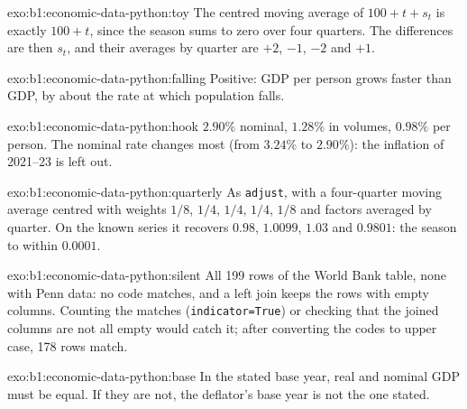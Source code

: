 \begin{solution}{exo:b1:economic-data-python:toy}
The centred moving average of $100 + t + s_t$ is exactly $100 + t$, since the
season sums to zero over four quarters. The differences are then $s_t$, and
their averages by quarter are $+2$, $-1$, $-2$ and $+1$.
\end{solution}

\begin{solution}{exo:b1:economic-data-python:falling}
Positive: GDP per person grows faster than GDP, by about the rate at which
population falls.
\end{solution}

\begin{solution}{exo:b1:economic-data-python:hook}
$2.90\%$ nominal, $1.28\%$ in volumes, $0.98\%$ per person. The nominal rate changes
most (from $3.24\%$ to $2.90\%$): the inflation of 2021--23 is left out.
\end{solution}

\begin{solution}{exo:b1:economic-data-python:quarterly}
As \texttt{adjust}, with a four-quarter moving average centred with weights $1/8$,
$1/4$, $1/4$, $1/4$, $1/8$ and factors averaged by quarter. On the known series it
recovers $0.98$, $1.0099$, $1.03$ and $0.9801$: the season to within $0.0001$.
\end{solution}

\begin{solution}{exo:b1:economic-data-python:silent}
All 199 rows of the World Bank table, none with Penn data: no code matches,
and a left join keeps the rows with empty columns. Counting the matches
(\texttt{indicator=True}) or checking that the joined columns are not all empty
would catch it; after converting the codes to upper case, 178 rows match.
\end{solution}

\begin{solution}{exo:b1:economic-data-python:base}
In the stated base year, real and nominal GDP must be equal. If they are
not, the deflator's base year is not the one stated.
\end{solution}

